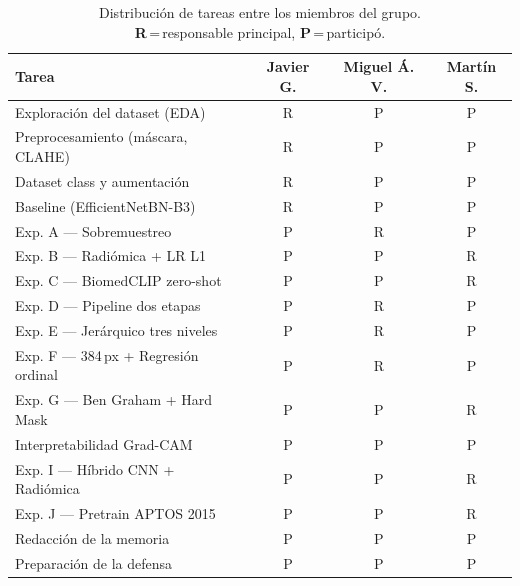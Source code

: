 \documentclass[12pt, a4paper]{article}
\begin{document}
\begin{table}[H]
  \centering
  \caption{Distribución de tareas entre los miembros del grupo. \\
    \textbf{R}\,=\,responsable principal, \textbf{P}\,=\,participó.}
  \label{tab:contribucion}
  \begin{tabularx}{\textwidth}{X c c c}
    \toprule
    \rowcolor{azuloscuro!15}
    \textbf{Tarea} &
    \textbf{\small Javier G.} &
    \textbf{\small Miguel Á. V.} &
    \textbf{\small Martín S.} \\
    \midrule
    Exploración del dataset (EDA)           & R & P & P \\
    \rowcolor{grisclaro}
    Preprocesamiento (máscara, CLAHE)       & R & P & P \\
    Dataset class y aumentación             & R & P & P \\
    \rowcolor{grisclaro}
    Baseline (EfficientNetBN-B3)            & R & P & P \\
    Exp. A --- Sobremuestreo                & P & R & P \\
    \rowcolor{grisclaro}
    Exp. B --- Radiómica + LR L1            & P & P & R\\
    Exp. C --- BiomedCLIP zero-shot         & P & P & R \\
    \rowcolor{grisclaro}
    Exp. D --- Pipeline dos etapas          & P & R & P \\
    Exp. E --- Jerárquico tres niveles      & P & R & P \\
    \rowcolor{grisclaro}
    Exp. F --- 384\,px + Regresión ordinal  & P & R & P \\
    Exp. G --- Ben Graham + Hard Mask       & P & P & R \\
    \rowcolor{grisclaro}
    Interpretabilidad Grad-CAM             & P & P & P \\
    Exp. I --- Híbrido CNN + Radiómica      & P & P & R\\
    \rowcolor{grisclaro}
    Exp. J --- Pretrain APTOS 2015          & P & P & R \\
    Redacción de la memoria                 & P & P & P \\
    \rowcolor{grisclaro}
    Preparación de la defensa               & P & P & P \\
    \bottomrule
  \end{tabularx}
\end{table}
\end{document}
